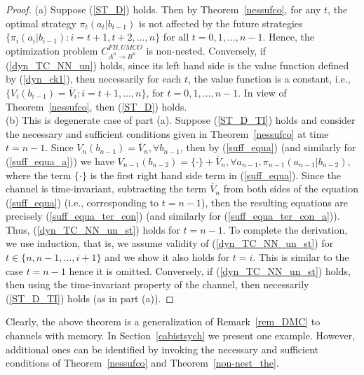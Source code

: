 \documentclass[11pt, a4paper, journal,onecolumn]{IEEEtran}
\newcommand{\rar}{\rightarrow}
\begin{document}
\begin{proof} (a) Suppose (\ref{ST_D}) holds. Then by Theorem~\ref{nessufco}, for any $t$, the optimal strategy $\pi_t(a_t|b_{t-1})$ is not affected by the future strategies $\{\pi_i(a_i|b_{i-1}): i=t+1, t+2, \ldots, n\}$ for all $t=0, 1,\ldots, n-1$. Hence, the optimization problem  $C_{A^n \rar B^n}^{FB,UMCO}$ is non-nested. Conversely, if  (\ref{dyn_TC_NN_un}) holds, since its left hand side is the value function defined by  (\ref{dyn_ck1}), then necessarily for each $t$, the value function is a constant, i.e.,  $\{V_i(b_{i-1})=\overline{V}_i: i=t+1, \ldots, n\}$, for $t=0, 1,\ldots, n-1$. In view of Theorem~\ref{nessufco}, then   (\ref{ST_D}) holds. \\
(b) This is degenerate case of part (a). Suppose (\ref{ST_D_TI}) holds and consider the necessary and sufficient conditions given in Theorem~\ref{nessufco} at time $t=n-1$. Since $V_n(b_{n-1})=\overline{V}_n, \forall b_{n-1}$, then by (\ref{suff_equa}) (and similarly for (\ref{suff_equa_a})) we have $V_{n-1}(b_{n-2})= \{\cdot \} + \overline{V}_n, \forall a_{n-1}, \pi_{n-1}(a_{n-1}|b_{n-2})$, where the term $\{\cdot\}$ is the first right hand side term in  (\ref{suff_equa}). Since the channel is time-invariant, subtracting the term $\overline{V}_n$ from both sides of the equation  (\ref{suff_equa})  (i.e., corresponding to $t=n-1$), then the resulting equations are precisely  (\ref{suff_equa_ter_con}) (and similarly for (\ref{suff_equa_ter_con_a})). Thus,  (\ref{dyn_TC_NN_un_st}) holds for $t=n-1$. To complete the derivation, we use induction, that is, we assume validity of (\ref{dyn_TC_NN_un_st}) for $t\in \{n,n-1, \ldots, i+1\}$ and we show it also holds for $t=i$. This is similar to the case $t=n-1$ hence it is omitted. Conversely, if (\ref{dyn_TC_NN_un_st}) holds, then using the time-invariant property of the channel, then necessarily (\ref{ST_D_TI}) holds (as in part (a)).
\end{proof}


Clearly, the above theorem is a generalization of Remark~\ref{rem_DMC} to channels with memory.  In Section~\ref{cabistsych} we present one example. However, additional ones can be identified by invoking the necessary and sufficient conditions of  Theorem~\ref{nessufco} and Theorem~\ref{non-nest_the}.
\end{document}
